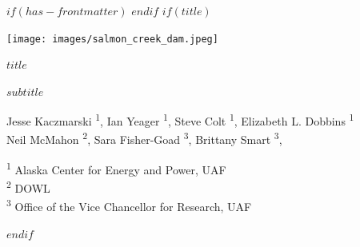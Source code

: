 
$if(has-frontmatter)$
\frontmatter
$endif$
$if(title)$
\cleardoublepage
\thispagestyle{empty}
{\centering

\vspace*{-3cm}


\vspace{3ex}

\par\noindent\hspace*{-1cm}\texttt{[image: images/salmon\_creek\_dam.jpeg]}

\vspace{3ex}


{\huge\bfseries\color{uafblue} $title$ \par}
\vspace{2ex}
{\large\bfseries\color{uafblue} $subtitle$ \par}

\vspace{3ex}

{\normalsize
  Jesse Kaczmarski \textsuperscript{1}, 
  Ian Yeager \textsuperscript{1}, 
  Steve Colt \textsuperscript{1},
  Elizabeth L. Dobbins \textsuperscript{1}\\
  Neil McMahon \textsuperscript{2}, 
  Sara Fisher-Goad \textsuperscript{3}, 
  Brittany Smart \textsuperscript{3}, 
}

\vspace{5ex}

{\normalsize
  \textsuperscript{1} Alaska Center for Energy and Power, UAF \\
  \textsuperscript{2} DOWL \\
  \textsuperscript{3} Office of the Vice Chancellor for Research, UAF
}


}
$endif$


